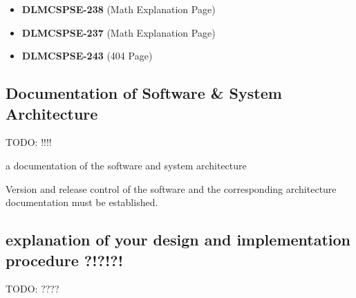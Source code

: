 \begin{itemize}
\item {\textbf{\color{TAGpurple}\ttfamily DLMCSPSE-238 }}(Math Explanation Page)
\item {\textbf{\color{TAGpurple}\ttfamily DLMCSPSE-237 }}(Math Explanation Page)
\item {\textbf{\color{TAGpurple}\ttfamily DLMCSPSE-243 }}(404 Page)
\end{itemize}

\subsection{Documentation of Software \& System Architecture}
TODO: !!!!

a documentation of the software and system architecture

Version and release control of the software and the corresponding architecture documentation must be established.

\subsection{explanation of your design and implementation procedure ?!?!?!}
TODO: ????